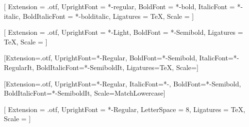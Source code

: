 \RequirePackage[no-math]{fontspec}
\setmainfont{texgyretermes}[
    Extension = {.otf},
    UprightFont = {*-regular},
    BoldFont = {*-bold},
    ItalicFont = {*-italic},
    BoldItalicFont = {*-bolditalic},
    Ligatures = TeX,
    Scale = \thesis@fontscale   %
]

\newfontfamily{\sourcesans}{\thesis@sourcesans}[
    Extension   = {.otf},
    UprightFont = {*-Light},
    BoldFont    = {*-Semibold},
    Ligatures   = TeX,    %
    Scale       = \thesis@fontscale
]

\setsansfont{\thesis@sourcesans}[Extension={.otf}, UprightFont={*-Regular}, BoldFont={*-Semibold}, ItalicFont={*-RegularIt}, BoldItalicFont={*-SemiboldIt}, Ligatures=TeX, Scale=\thesis@fontscale]

\setmonofont{SourceCodePro}[Extension=.otf, UprightFont=*-Regular, ItalicFont=*-\thesis@tmp,
    BoldFont=*-Semibold, BoldItalicFont=*-SemiboldIt, Scale=MatchLowercase]

\newfontfamily{\runningheadcaps}{\thesis@sourcesans}[
    Extension   = {.otf},
    UprightFont = {*-Regular},
    LetterSpace = 8,
    Ligatures   = TeX,
    Scale       = \thesis@fontscale
]
\newcommand{\runningheadtext}[1]{{\small\runningheadcaps\MakeUppercase{#1}}}
\newcommand{\runningheadfolio}{\small\sffamily}

\newcommand{\headingfont}{\sourcesans}
